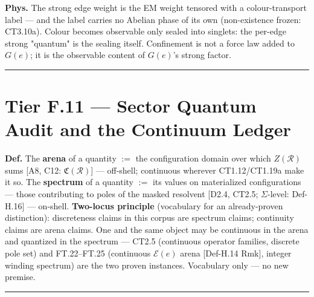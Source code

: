 \begin{theorem}
\textbf{Phys.} The strong edge weight is the EM weight tensored with a colour-transport label — and the label carries no Abelian phase of its own (non-existence frozen: CT3.10a). Colour becomes observable only sealed into singlets: the per-edge strong "quantum" is the sealing itself. Confinement is not a force law added to $G(e)$; it is the observable content of $G(e)$'s strong factor.

\vspace{2pt}\noindent\rule{\textwidth}{0.4pt}\vspace{2pt}

\end{theorem}

\section[Tier F.11 — Sector Quantum Audit and the Continuum Ledger]{\texorpdfstring{Tier F.11 — Sector Quantum Audit and the Continuum Ledger}{Tier F.11 - Sector Quantum Audit and the Continuum Ledger}}

\begin{definition}\label{tag:Def-H-18}
\textbf{Def.} The \textbf{arena} of a quantity $:=$ the configuration domain over which $Z(\mathcal R)$ sums [A8, C12: $\mathfrak C(\mathcal R)$] — off-shell; continuous wherever CT1.12/CT1.19a make it so. The \textbf{spectrum} of a quantity $:=$ its values on materialized configurations — those contributing to poles of the masked resolvent [D2.4, CT2.5; $\Sigma$-level: Def-H.16] — on-shell. \textbf{Two-locus principle} (vocabulary for an already-proven distinction): discreteness claims in this corpus are spectrum claims; continuity claims are arena claims. One and the same object may be continuous in the arena and quantized in the spectrum — CT2.5 (continuous operator families, discrete pole set) and FT.22–FT.25 (continuous $\mathcal E(e)$ arena [Def-H.14 Rmk], integer winding spectrum) are the two proven instances. Vocabulary only — no new premise.

\vspace{2pt}\noindent\rule{\textwidth}{0.4pt}\vspace{2pt}

\end{definition}

